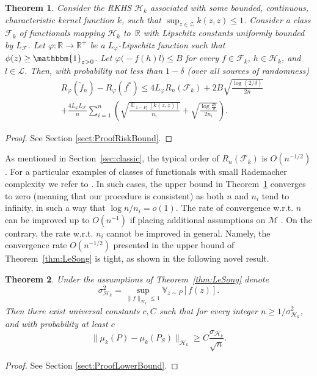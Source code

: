 \documentclass{article}
\newtheorem{theorem}{Theorem}
\DeclareMathOperator*{\E}{\mathbb{E}\,}
\renewcommand{\H}{\mathcal{H}}
\newcommand{\F}{\mathcal{F}}
\newcommand{\M}{\mathscr{M}}
\newcommand{\Z}{\mathcal{Z}}
\newcommand{\R}{\mathbb{R}}
\renewcommand{\L}{\mathcal{L}}
\newcommand{\Rp}{R_{\varphi}}
\newcommand{\f}{f^*}
\newcommand{\fnt}{\tilde{f}_n}
\begin{document}
\begin{theorem}
\label{thm:risk-bound}
Consider the RKHS $\H_k$ associated with some bounded, continuous,
characteristic kernel function $k$, such that $\sup_{z \in \Z} k(z,z)\leq 1$.
Consider a class $\F_k$ of functionals mapping $\H_k$ to~$\R$ with Lipschitz
constants uniformly bounded by $L_{\F}$.  Let $\varphi\colon \R\to\R^+$ be a
$L_{\varphi}$-Lipschitz function such that $\phi(z) \geq \mathbbm{1}_{z>0}$.
Let $\varphi\bigl(-f(h) l\bigr) \leq B$ for every $f\in\F_k$, $h \in \H_k$, and
$l\in\L$.  Then, with probability not less than $1-\delta$ (over all sources of
randomness) 
\begin{align*}
&\Rp(\fnt) - \Rp(\f)
\leq
4 L_\varphi R_n(\F_k) + 2B\sqrt{\frac{\log(2/\delta)}{2n}}\\
&+
\frac{4L_\varphi L_{\F}}{n}
\sum_{i=1}^n
\left(
\sqrt{\frac{\E_{z\sim P_i}[k(z,z)]}{n_i}} + \sqrt{\frac{\log\frac{2n}{\delta}}{2n_i}}
\right).
\end{align*}
\end{theorem}
\begin{proof}
See Section \ref{sect:ProofRiskBound}.
\end{proof}
As mentioned in Section~\ref{sec:classic}, the typical order of $R_n(\F_k)$ is
$O(n^{-1/2})$. 
For a particular examples of classes of functionals with small Rademacher complexity we refer to \citet{Maurer06}.
In such cases, the upper bound in Theorem~\ref{thm:risk-bound}
converges to zero (meaning that our procedure is consistent) as both $n$ and
$n_i$ tend to infinity, in such a way that $\log n/n_i = o(1)$.  The rate of
convergence w.r.t. $n$ can be improved up to $O(n^{-1})$ if placing additional
assumptions on $\M$ \cite{BBM05}. On the contrary, the rate w.r.t. $n_i$ cannot
be improved in general. Namely, the convergence rate $O(n^{-1/2})$ presented in the upper bound of Theorem~\ref{thm:LeSong} is
tight, as shown in the following novel result.
\begin{theorem}
\label{thm:lower-bound}
Under the assumptions of Theorem~\ref{thm:LeSong} denote
\[
\sigma^2_{\H_k} = \sup_{\|f\|_{\H_k}\leq 1} \mathbb{V}_{z\sim P}[f(z)].
\]
Then there exist universal constants $c,C$ such that for every integer $n\geq
1/\sigma^2_{\H_k}$, and with probability at least $c$
\[
\|\mu_k(P) - \mu_k(P_S)\|_{\H_k}
\geq
C\frac{\sigma_{\H_k}}{\sqrt{n}}.
\]  
\end{theorem}
\begin{proof}
See Section \ref{sect:ProofLowerBound}.
\end{proof}
\end{document}
